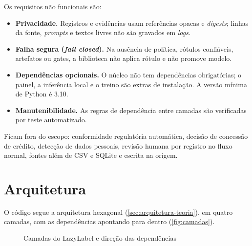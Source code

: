 Os requisitos não funcionais são:

\begin{itemize}
  \item \textbf{Privacidade.} Registros e evidências usam referências opacas e \emph{digests}; linhas da fonte, \emph{prompts} e textos livres não são gravados em \emph{logs}.
  \item \textbf{Falha segura (\emph{fail closed}).} Na ausência de política, rótulos confiáveis, artefatos ou gates, a biblioteca não aplica rótulo e não promove modelo.
  \item \textbf{Dependências opcionais.} O núcleo não tem dependências obrigatórias; o painel, a inferência local e o treino são extras de instalação. A versão mínima de Python é 3.10.
  \item \textbf{Manutenibilidade.} As regras de dependência entre camadas são verificadas por teste automatizado.
\end{itemize}

Ficam fora do escopo: conformidade regulatória automática, decisão de concessão de crédito, detecção de dados pessoais, revisão humana por registro no fluxo normal, fontes além de CSV e SQLite e escrita na origem.

\section{Arquitetura}

O código segue a arquitetura hexagonal (\autoref{sec:arquitetura-teoria}), em quatro camadas, com as dependências apontando para dentro (\autoref{fig:camadas}).

\begin{figure}[htb]
  \centering
  \caption{Camadas do LazyLabel e direção das dependências}
  \label{fig:camadas}
\end{figure}

